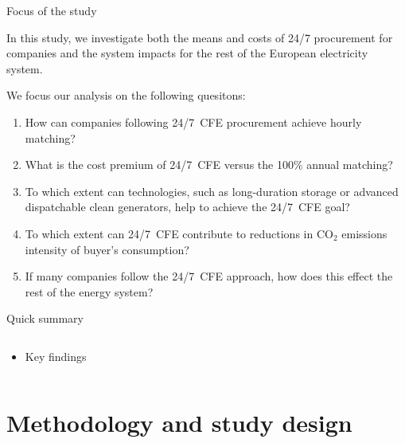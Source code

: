 \begin{frame}{Focus of the study}
  
  In this study, we investigate both the \alert{means and costs of 24/7 procurement} for companies
  and the \alert{system impacts} for the rest of the European electricity system. 

  We focus our analysis on the following quesitons:

    \begin{enumerate}
    \item How can companies following 24/7~CFE procurement achieve hourly matching?
    \item What is the cost premium of 24/7~CFE versus the 100\% annual matching?
    \item To which extent can technologies, such as long-duration storage or advanced dispatchable
          clean generators, help to achieve the 24/7~CFE goal?
    \item To which extent can 24/7~CFE contribute to reductions in CO$_2$
          emissions intensity of buyer's consumption? 
    \item If many companies follow the 24/7~CFE approach, how does this effect the rest of
          the energy system?
    \end{enumerate}
  
\end{frame}



\begin{frame}{Quick summary}
  
  \begin{columns}[T]
  \begin{column}{9cm}
  \centering

    \begin{itemize}
    \item Key findings
    \end{itemize}
  \end{column}
  \end{columns}
  
\end{frame}


\section{Methodology and study design}


